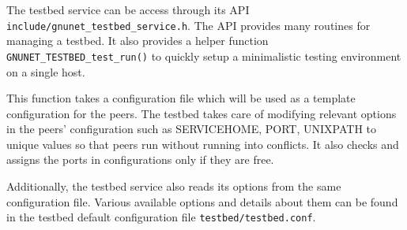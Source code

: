 \documentclass[10pt]{article}
\begin{document}
The testbed service can be access through its API
\texttt{include/gnunet\_testbed\_service.h}.  The API provides many routines for
managing a testbed.  It also provides a helper function
\texttt{GNUNET\_TESTBED\_test\_run()} to quickly setup a minimalistic testing
environment on a single host.

This function takes a configuration file which will be used as a template
configuration for the peers.  The testbed takes care of modifying relevant
options in the peers' configuration such as SERVICEHOME, PORT, UNIXPATH to
unique values so that peers run without running into conflicts.  It also checks
and assigns the ports in configurations only if they are free.  

Additionally, the testbed service also reads its options from the same
configuration file.  Various available options and details about them can be
found in the testbed default configuration file \texttt{testbed/testbed.conf}.
\end{document}
